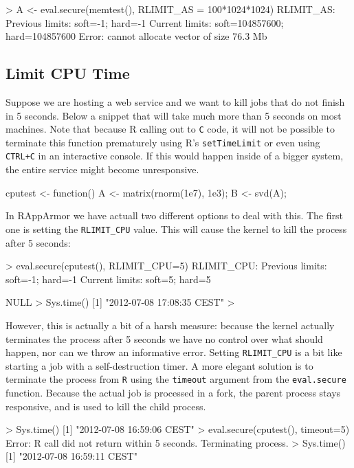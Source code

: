 \documentclass[article]{jss}
\begin{document}
\begin{appendices}
\begin{CodeChunk}
\begin{CodeInput}
> A <- eval.secure(memtest(), RLIMIT_AS = 100*1024*1024)
RLIMIT_AS:
Previous limits: soft=-1; hard=-1
Current limits: soft=104857600; hard=104857600
Error: cannot allocate vector of size 76.3 Mb
\end{CodeInput}
\end{CodeChunk}


\subsection{Limit CPU Time}

Suppose we are hosting a web service and we want to kill jobs that do not finish
in 5 seconds. Below a snippet that will take much more than 5 seconds on most
machines. Note that because R calling out to \texttt{C} code, it will not be
possible to terminate this function prematurely using R's \texttt{setTimeLimit}
or even using \texttt{CTRL+C} in an interactive console. If this would happen
inside of a bigger system, the entire service might become unresponsive.

\begin{CodeChunk}
\begin{CodeInput}
cputest <- function(){
  A <- matrix(rnorm(1e7), 1e3);
  B <- svd(A);
}
\end{CodeInput}
\end{CodeChunk}
In RAppArmor we have actuall two different options to deal with this. The first
one is setting the \texttt{RLIMIT\_CPU} value. This will cause the kernel to
kill the process after 5 seconds: 
\begin{CodeChunk}
\begin{CodeInput}
> eval.secure(cputest(), RLIMIT_CPU=5)
RLIMIT_CPU:
Previous limits: soft=-1; hard=-1
Current limits: soft=5; hard=5

NULL
> Sys.time()
[1] "2012-07-08 17:08:35 CEST"
>
\end{CodeInput}
\end{CodeChunk}
However, this is actually a bit of a harsh measure: because the kernel actually
terminates the process after 5 seconds we have no control over what should
happen, nor can we throw an informative error. Setting \texttt{RLIMIT\_CPU} is
a bit like starting a job with a self-destruction timer. A more elegant
solution is to terminate the process from \texttt{R} using the \texttt{timeout}
argument from the \texttt{eval.secure} function. Because the actual job is processed in a fork, the parent process stays responsive, and is used to kill the child process.
\begin{CodeChunk}
\begin{CodeInput}
> Sys.time()
[1] "2012-07-08 16:59:06 CEST"
> eval.secure(cputest(), timeout=5)
Error: R call did not return within 5 seconds. Terminating process.
> Sys.time()
[1] "2012-07-08 16:59:11 CEST"
\end{CodeInput}
\end{CodeChunk}


\end{appendices}
\end{document}
